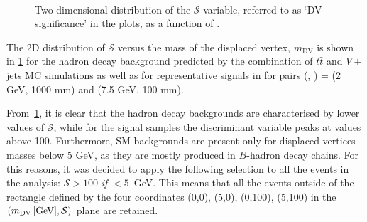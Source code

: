 \begin{figure}[!ht]
    \centering
    \\
    \caption{Two-dimensional distribution of the $\mathcal{S}$ variable, referred to as `DV significance' in the plots, as a function of \mdv.}
    \label{fig:dvsigni_MDV}
\end{figure}

The 2D distribution of $\mathcal{S}$ versus the mass of the displaced vertex, $m_{\text{DV}}$ is shown in \cref{fig:dvsigni_MDV} for the hadron decay background predicted by the combination of $t\bar{t}$ and $V+$jets MC simulations as well as for representative signals in for pairs (\mhnl, \ctau) = (2 GeV, 1000 mm) and (7.5 GeV, 100 mm).

From~\cref{fig:dvsigni_MDV}, it is clear that the hadron decay backgrounds are characterised by lower values of $\mathcal{S}$, while for the signal samples the discriminant variable peaks at values above 100. Furthermore, SM backgrounds are present only for displaced vertices masses below 5 GeV, as they are mostly produced in $B$-hadron decay chains. For this reasons, it was decided to apply the following selection to all the events in the analysis: $\mathcal{S}>100$ \textit{if} \mdv$<5$~GeV. This means that all the events outside of the rectangle defined by the four coordinates (0,0), (5,0), (0,100), (5,100) in the $(m_{\mathrm{DV}}\,[\text{GeV}],\mathcal{S})$ plane are retained.

